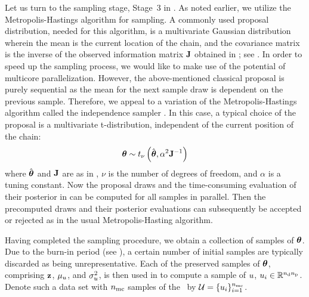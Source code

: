 Let us turn to the sampling stage, Stage~3 in . As noted earlier, we utilize the Metropolis-Hastings algorithm for sampling.
A commonly used proposal distribution, needed for this algorithm, is a multivariate Gaussian distribution wherein the mean is the current location of the chain, and the covariance matrix is the inverse of the observed information matrix $\mathbf{J}$ obtained in ; see \cite{gelman2004, bernardo2007}.
In order to speed up the sampling process, we would like to make use of the potential of multicore parallelization. However, the above-mentioned classical proposal is purely sequential as the mean for the next sample draw is dependent on the previous sample. Therefore, we appeal to a variation of the Metropolis-Hastings algorithm called the independence sampler \cite{gelman2004}. In this case, a typical choice of the proposal is a multivariate t-distribution, independent of the current position of the chain:
\begin{equation} \elabel{proposal}
  \vparam \sim \studentst{\nu}{\hat{\vparam}}{\alpha^2 \mOI^{-1}}
\end{equation}
where $\hat{{\boldsymbol\theta}}$ and $\mathbf{J}$ are as in , $\nu$ is the number of degrees of freedom, and $\alpha$ is a tuning constant. Now the proposal draws and the time-consuming evaluation of their posterior in  can be computed for all samples in parallel.
Then the precomputed draws and their posterior evaluations can subsequently be accepted or rejected as in the usual Metropolis-Hasting algorithm.

Having completed the sampling procedure, we obtain a collection of samples of ${\boldsymbol\theta}$. Due to the burn-in period (see ), a certain number of initial samples are typically discarded as being unrepresentative.
Each of the preserved samples of ${\boldsymbol\theta}$, comprising $\mathbf{z}$, $\mu_u$, and $\sigma^2_u$, is then used in  to compute a sample of $u$, $u_i \in \mathbb{R}^{{n_\text{d}} {n_\text{p}}}$.
Denote such a data set with ${n_\text{mc}}$ samples of the \qoi\ by $\mathcal{U} = \{ u_i \}_{i = 1}^{n_\text{mc}}$.
